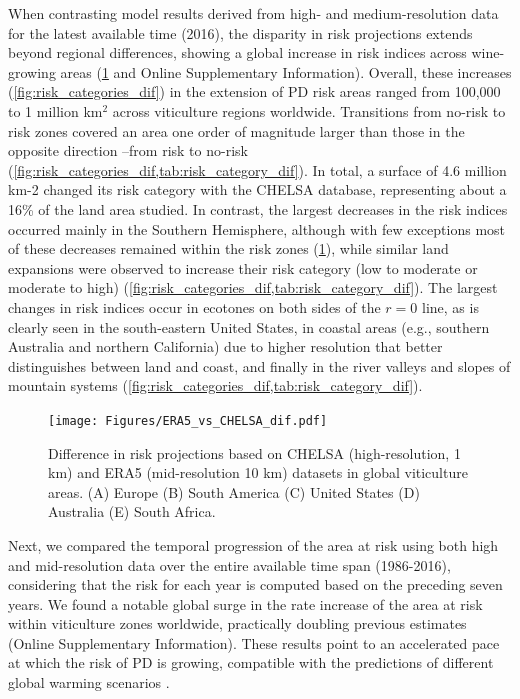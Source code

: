 When contrasting model results derived from high- and medium-resolution
data for the latest available time (2016), the disparity in risk projections
extends beyond regional differences, showing a global increase in risk indices
across wine-growing areas (\cref{fig:risk_indices_dif} and
Online Supplementary Information).  Overall, these increases
(\cref{fig:risk_categories_dif}) in the extension of PD risk areas ranged from
100,000 to 1 million km$^2$ across viticulture regions worldwide. Transitions
from no-risk to risk zones covered an area one order of magnitude larger than
those in the opposite direction --from risk to no-risk
(\cref{fig:risk_categories_dif,tab:risk_category_dif}). In total, a surface of
4.6 million km-2 changed its risk category with the CHELSA database,
representing about a 16\% of the land area studied. In contrast, the largest
decreases in the risk indices occurred mainly in the Southern Hemisphere,
although with few exceptions most of these decreases remained within the risk
zones (\cref{fig:risk_indices_dif}), while similar land expansions were
observed to  increase their risk category (low to moderate or moderate to high)
(\cref{fig:risk_categories_dif,tab:risk_category_dif}). The largest changes in
risk indices occur in ecotones on both sides of the $r=0$ line, as is clearly
seen in the south-eastern United States, in coastal areas (e.g., southern
Australia and northern California) due to higher resolution that better
distinguishes between land and coast, and finally in the river valleys and
slopes of mountain systems
(\cref{fig:risk_categories_dif,tab:risk_category_dif}).

\begin{figure}[H]
    \centering
    \texttt{[image: Figures/ERA5\_vs\_CHELSA\_dif.pdf]}
    \caption{Difference in risk projections based on CHELSA
        (high-resolution, 1 km) and ERA5 (mid-resolution 10 km) datasets in
        global
        viticulture areas. (A) Europe (B) South America (C) United States (D)
        Australia
        (E) South Africa.}
    \label{fig:risk_indices_dif}
\end{figure}

Next, we compared the temporal progression of the area at risk using both
high and mid-resolution data over the entire available time span (1986-2016),
considering that the risk for each year is computed based on the preceding
seven years. We found a notable global surge in the rate increase of the area
at risk within viticulture zones worldwide, practically doubling previous
estimates (Online Supplementary Information). These results point to an
accelerated
pace at which the risk of PD is growing, compatible with the predictions of
different global warming scenarios \cite{GimenezRomero2023_PD}.

